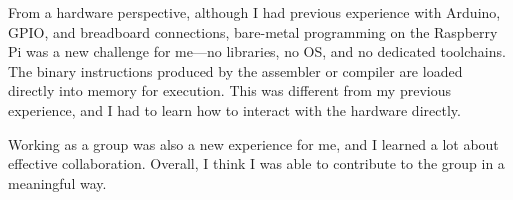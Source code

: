\documentclass[9pt,a4paper]{article}
\begin{document}
From a hardware perspective, although I had previous experience with Arduino, GPIO, and breadboard connections, bare-metal programming on the Raspberry Pi was a new challenge for me—no libraries, no OS, and no dedicated toolchains.
The binary instructions produced by the assembler or compiler are loaded directly into memory for execution. This was different from my previous experience, and I had to learn how to interact with the hardware directly.

Working as a group was also a new experience for me, and I learned a lot about effective collaboration.
Overall, I think I was able to contribute to the group in a meaningful way.
\end{document}
